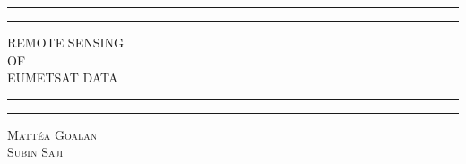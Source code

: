 \documentclass{physics_article_B}
\begin{document}
\begin{titlepage} %

	\centering %
	
	\scshape %
	
	\vspace*{\baselineskip} %
	
	
	\rule{\textwidth}{1.6pt}\vspace*{-\baselineskip}\vspace*{2pt} %
	\rule{\textwidth}{0.4pt} %
	
	\vspace{0.75\baselineskip} %
	
	{\LARGE REMOTE SENSING\\ OF \\ EUMETSAT DATA\\} %
	
	\vspace{0.75\baselineskip} %
	
	\rule{\textwidth}{0.4pt}\vspace*{-\baselineskip}\vspace{3.2pt} %
	\rule{\textwidth}{1.6pt} %
	
	\vspace{2\baselineskip} %
	
	
	
	\vspace*{\baselineskip} %
	
	
	
	\vspace{0.7cm} %
	
	{\scshape\Large Matt\'ea Goalan\\Subin Saji \\ } %
	

\end{titlepage}
\end{document}
